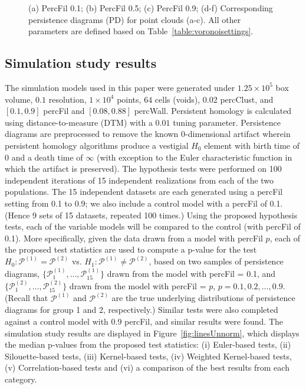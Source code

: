 \documentclass[12pt]{article}
\begin{document}
\begin{center}
\begin{figure}[htp!]
\begin{subfigure}{.32\textwidth}
      \label{fig:percfil09pd}
    \end{subfigure}
      \caption{(a) PercFil 0.1; (b) PercFil 0.5; (c) PercFil 0.9; (d-f) Corresponding persistence diagrams (PD) for point clouds (a-c). All other parameters are defined based on Table~\ref{table:voronoisettings}.}
      \label{fig:percfilexample}
  \end{figure}
\end{center}

\subsection{Simulation study results} \label{sec:results1} %
The simulation models used in this paper were generated under $1.25 \times  10^{5}$ box volume, $0.1$ resolution, $1 \times  10^{4}$ points, $64$ cells (voids), 0.02 percClust, and $[0.1, 0.9]$ percFil and $[0.08, 0.88]$ percWall. Persistent homology is calculated using distance-to-measure (DTM) with a $0.01$ tuning parameter. Persistence diagrams are preprocessed to remove the known 0-dimensional artifact wherein persistent homology algorithms produce a vestigial $H_{0}$ element with birth time of 0 and a death time of $\infty$ (with exception to the Euler characteristic function in which the artifact is preserved).  
The hypothesis tests were performed on 100 independent iterations of 15 independent realizations from each of the two populations.
The 15 independent datasets are each generated using a percFil setting from 0.1 to 0.9; we also include a control model with a percFil of 0.1.  (Hence 9 sets of 15 datasets, repeated 100 times.)
Using the proposed hypothesis tests, each of the variable models will be compared to the control (with percFil of 0.1). 
More specifically, given the data drawn from a model with percFil $p$, each of the proposed test statistics are used to compute a  p-value for the test $H_0: \mathcal 
P^{(1)} = \mathcal P^{(2)}$ vs. $H_1: \mathcal P^{(1)} \neq \mathcal P^{(2)}$, 
based on two samples of persistence diagrams, $\{\mathcal 
P_1^{(1)}, \ldots, \mathcal P_{15}^{(1)}\}$ drawn from the model with percFil = 0.1, and $\{\mathcal P_1^{(2)}, \ldots, 
\mathcal P_{15}^{(2)}\}$ drawn from the model with percFil = $p$, $p = 0.1, 0.2, \ldots, 0.9$.  
(Recall that $\mathcal P^{(1)}$ and $\mathcal P^{(2)}$ are the true underlying 
distributions of persistence diagrams for group 1 and 2, respectively.)  
Similar tests were also completed against a control model with 0.9 percFil, and similar results were found. The simulation study results are displayed in Figure~\ref{fig:linesUnnorm}, which displays the median p-values from the proposed test statistics: (i) Euler-based tests, (ii) Silouette-based tests, (iii) Kernel-based  tests, (iv) Weighted Kernel-based tests, (v) Correlation-based tests and (vi) a comparison of the best results from each category.
\end{document}
